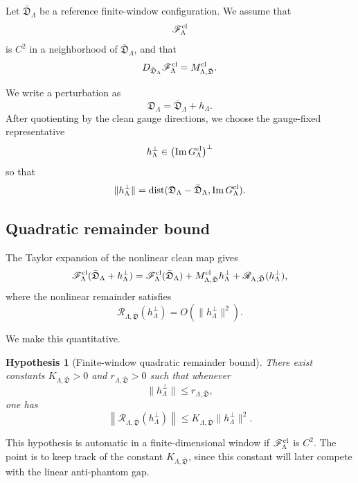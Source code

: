 \documentclass[11pt]{article}
\numberwithin{equation}{section}
\newtheorem{hypothesis}[theorem]{Hypothesis}
\begin{document}
Let \(\bar{\mathfrak D}_\Lambda\) be a reference finite-window
configuration.  We assume that
\[
        \mathscr F_\Lambda^{\rm cl}
\]
is \(C^2\) in a neighborhood of \(\bar{\mathfrak D}_\Lambda\), and that
\[
        D_{\bar{\mathfrak D}_\Lambda}
        \mathscr F_\Lambda^{\rm cl}
        =
        M_{\Lambda,\bar{\mathfrak D}}^{\rm cl}.
\]

We write a perturbation as
\[
        \mathfrak D_\Lambda
        =
        \bar{\mathfrak D}_\Lambda+h_\Lambda .
\]
After quotienting by the clean gauge directions, we choose the gauge-fixed
representative
\[
        h_\Lambda^\perp
        \in
        \bigl(\operatorname{Im}G_\Lambda^{\rm cl}\bigr)^\perp
\]
so that
\[
        \|h_\Lambda^\perp\|
        =
        \operatorname{dist}
        (\mathfrak D_\Lambda-\bar{\mathfrak D}_\Lambda,
        \operatorname{Im}G_\Lambda^{\rm cl}).
\]

\subsection{Quadratic remainder bound}

The Taylor expansion of the nonlinear clean map gives
\[
        \mathscr F_\Lambda^{\rm cl}
        (\bar{\mathfrak D}_\Lambda+h_\Lambda^\perp)
        =
        \mathscr F_\Lambda^{\rm cl}(\bar{\mathfrak D}_\Lambda)
        +
        M_{\Lambda,\bar{\mathfrak D}}^{\rm cl}h_\Lambda^\perp
        +
        \mathscr R_{\Lambda,\bar{\mathfrak D}}(h_\Lambda^\perp),
\]
where the nonlinear remainder satisfies
\[
        \mathscr R_{\Lambda,\bar{\mathfrak D}}(h_\Lambda^\perp)
        =
        O(\|h_\Lambda^\perp\|^2).
\]

We make this quantitative.

\begin{hypothesis}[Finite-window quadratic remainder bound]
\label{hyp:quadratic-remainder}
There exist constants \(K_{\Lambda,\bar{\mathfrak D}}>0\) and
\(r_{\Lambda,\bar{\mathfrak D}}>0\) such that whenever
\[
        \|h_\Lambda^\perp\|
        \le r_{\Lambda,\bar{\mathfrak D}},
\]
one has
\[
        \left\|
        \mathscr R_{\Lambda,\bar{\mathfrak D}}(h_\Lambda^\perp)
        \right\|
        \le
        K_{\Lambda,\bar{\mathfrak D}}
        \|h_\Lambda^\perp\|^2 .
\]
\end{hypothesis}

This hypothesis is automatic in a finite-dimensional window if
\(\mathscr F_\Lambda^{\rm cl}\) is \(C^2\).  The point is to keep track of
the constant \(K_{\Lambda,\bar{\mathfrak D}}\), since this constant will
later compete with the linear anti-phantom gap.
\end{document}
